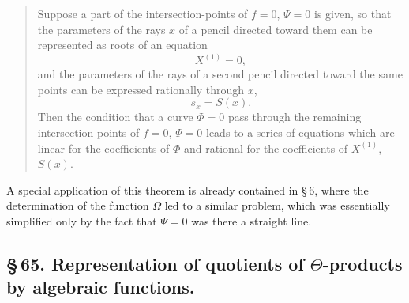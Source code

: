 \documentclass[10pt]{article}
\begin{document}
\begin{quote}
Suppose a part of the intersection-points of \(f=0\), \(\Psi=0\) is given, so that the parameters of the rays \(x\) of a pencil directed toward them can be represented as roots of an equation
\[
X^{(1)}=0,
\]
and the parameters of the rays of a second pencil directed toward the same points can be expressed rationally through \(x\),
\[
s_x=S(x).
\]
Then the condition that a curve \(\Phi=0\) pass through the remaining intersection-points of \(f=0\), \(\Psi=0\) leads to a series of equations which are linear for the coefficients of \(\Phi\) and rational for the coefficients of \(X^{(1)}\), \(S(x)\).
\end{quote}

A special application of this theorem is already contained in \S\,6, where the determination of the function \(\Omega\) led to a similar problem, which was essentially simplified only by the fact that \(\Psi=0\) was there a straight line.

\subsection*{\S\,65. Representation of quotients of \(\Theta\)-products by algebraic functions.}
\end{document}
